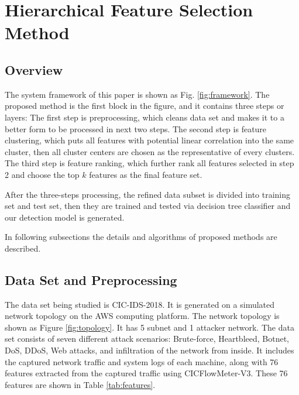 \documentclass[journal]{IEEEtran}
\begin{document}



\section{Hierarchical Feature Selection Method}
\label{sec:methods}

\subsection{Overview}

The system framework of this paper is shown as Fig. \ref{fig:framework}. 
The proposed method is the first block in the figure, and it contains three steps or layers: The first step is preprocessing, which cleans data set and makes it to a better form to be processed in next two steps. The second step is feature clustering, which puts all features with potential linear correlation into the same cluster, then all cluster centers are chosen as the representative of every clusters. The third step is feature ranking, which further rank all features selected in step 2 and choose the top $k$ features as the final feature set. 

After the three-steps processing, the refined data subset is divided into training set and test set, then they are trained and tested via decision tree classifier and our detection model is generated.

In following subsections the details and algorithms of proposed methods are described.

\subsection{Data Set and Preprocessing}

The data set being studied is CIC-IDS-2018\cite{cic2018}. 
It is generated on a simulated network topology on the AWS computing platform. The network topology is shown as Figure \ref{fig:topology}. It has 5 subnet and 1 attacker network.  
The data set consists of seven different attack scenarios: Brute-force, Heartbleed, Botnet, DoS, DDoS, Web attacks, and infiltration of the network from inside. It includes the captured network traffic and system logs of each machine, along with 76 features extracted from the captured traffic using CICFlowMeter-V3\cite{cicflowmeter}. These 76 features are shown in Table \ref{tab:features}.
\end{document}
